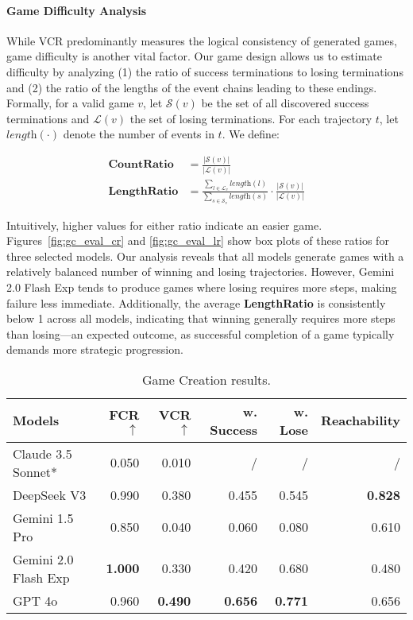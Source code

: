 \paragraph{Game Difficulty Analysis} While VCR predominantly measures the logical consistency of generated games, game difficulty is another vital factor. Our game design allows us to estimate difficulty by analyzing (1) the ratio of success terminations to losing terminations and (2) the ratio of the lengths of the event chains leading to these endings. Formally, for a valid game $v$, let $\mathcal{S}(v)$ be the set of all discovered success terminations and $\mathcal{L}(v)$ the set of losing terminations. For each trajectory $t$, let $\textit{length}(\cdot)$ denote the number of events in $t$. We define:

\begin{equation*}
    \begin{aligned}
        \textbf{CountRatio} &= \frac{|\mathcal{S}(v)|}{|\mathcal{L}(v)|} \\
        \textbf{LengthRatio} &= \frac{\sum_{l\in\mathcal{L}_v} \textit{length}(l)}{\sum_{s\in\mathcal{S}_v} \textit{length}(s)}\cdot \frac{|\mathcal{S}(v)|}{|\mathcal{L}(v)|}
    \end{aligned}
\end{equation*}

Intuitively, higher values for either ratio indicate an easier game. Figures~\ref{fig:gc_eval_cr} and \ref{fig:gc_eval_lr} show box plots of these ratios for three selected models. Our analysis reveals that all models generate games with a relatively balanced number of winning and losing trajectories. However, Gemini 2.0 Flash Exp tends to produce games where losing requires more steps, making failure less immediate. Additionally, the average \textbf{LengthRatio} is consistently below 1 across all models, indicating that winning generally requires more steps than losing—an expected outcome, as successful completion of a game typically demands more strategic progression.

\begin{table*}[!ht]
    \centering
    \begin{tabular}{lrrrrr}
    \toprule
    Models & FCR $\uparrow$& VCR $\uparrow$& w. Success & w. Lose &  Reachability\\
    \midrule
    Claude 3.5 Sonnet* & 0.050 & 0.010 & / & / & /\\
    DeepSeek V3       & 0.990 & 0.380 & 0.455 & 0.545 & \textbf{0.828}\\
    Gemini 1.5 Pro    & 0.850 & 0.040 & 0.060 & 0.080 & 0.610\\
    Gemini 2.0 Flash Exp & \textbf{1.000} & 0.330 & 0.420 & 0.680 & 0.480\\
    GPT 4o            & 0.960 & \textbf{0.490} & \textbf{0.656} & \textbf{0.771} & 0.656\\
    \bottomrule
    \end{tabular}
    \caption{Game Creation results.}
    \label{tab:gc_eval_main}
\end{table*}

